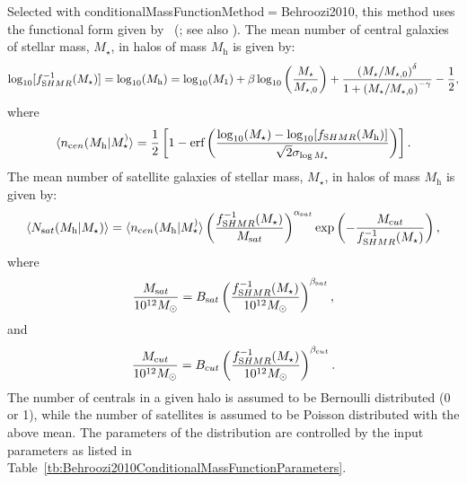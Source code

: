 Selected with {\normalfont \ttfamily conditionalMassFunctionMethod}$=${\normalfont \ttfamily Behroozi2010}, this method uses the functional form given by \citeauthor{behroozi_comprehensive_2010}~(\citeyear{behroozi_comprehensive_2010}; see also \citealt{leauthaud_new_2011}). The mean number of central galaxies of stellar mass, $M_\star$, in halos of mass $M_{\mathrm h}$ is given by:
\begin{equation}
 \log_{10}[f_{\mathrm SHMR}^{-1}(M_\star)] = \log_{10}(M_{\mathrm h}) = \log_{10}(M_1) + \beta \log_{10}\left({M_\star\over M_{\star,0}}\right)+{\left( M_\star / M_{\star,0}\right)^\delta \over 1 + \left(M_\star/M_{\star,0}\right)^{-\gamma}} - {1\over 2},
\end{equation}
where
\begin{equation}
 \langle n_{\mathrm cen} (M_{\mathrm h}|M_\star^)\rangle = {1\over 2}\left[1 - \hbox{erf}\left( {\log_{10}(M_\star) - \log_{10}[f_{\mathrm SHMR}(M_{\mathrm h})] \over \sqrt{2}\sigma_{\log M_\star}}\right) \right].
\end{equation}
The mean number of satellite galaxies of stellar mass, $M_\star$, in halos of mass $M_{\mathrm h}$ is given by:
\begin{equation}
 \langle N_{\mathrm sat}(M_{\mathrm h}|M_\star)\rangle =  \langle n_{\mathrm cen} (M_{\mathrm h}|M_\star^)\rangle \left({f_{\mathrm SHMR}^{-1}(M_\star) \over M_{\mathrm sat}}\right)^{\alpha_{\mathrm sat}} \exp\left( - {M_{\mathrm cut} \over f_{\mathrm SHMR}^{-1}(M_\star)}\right),
\end{equation}
where
\begin{equation}
 {M_{\mathrm sat} \over 10^{12}M_\odot} = B_{\mathrm sat} \left({f_{\mathrm SHMR}^{-1}(M_\star) \over 10^{12}M_\odot}\right)^{\beta_{\mathrm sat}},
\end{equation}
and
\begin{equation}
 {M_{\mathrm cut} \over 10^{12}M_\odot} = B_{\mathrm cut} \left({f_{\mathrm SHMR}^{-1}(M_\star) \over 10^{12}M_\odot}\right)^{\beta_{\mathrm cut}}.
\end{equation}
The number of centrals in a given halo is assumed to be Bernoulli distributed (0 or 1), while the number of satellites is assumed to be Poisson distributed with the above mean. The parameters of the distribution are controlled by the input parameters as listed in Table~\ref{tb:Behroozi2010ConditionalMassFunctionParameters}.

